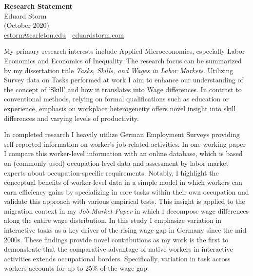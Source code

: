 \documentclass[a4paper,11pt]{article}
\begin{document}
\thispagestyle{plain}

\begin{center}
 {\Large \textbf{Research Statement}} \\
 Eduard Storm \\
 (October 2020) \\
 \href{mailto:estorm@carleton.edu}{estorm@carleton.edu} $|$ \href{https://eduardstorm.com/}{eduardstorm.com}
\end{center}

\noindent

My primary research interests include Applied Microeconomics, especially Labor Economics and Economics of Inequality. The research focus can be summarized by my dissertation title \textit{Tasks, Skills, and Wages in Labor Markets}. Utilizing Survey data on Tasks performed at work I aim to enhance our understanding of the concept of `Skill' and how it translates into Wage differences. In contrast to conventional methods, relying on formal qualifications such as education or experience, emphasis on workplace heterogeneity offers novel insight into skill differences and varying levels of productivity. 


In completed research I heavily utilize German Employment Surveys providing self-reported information on worker's job-related activities. In one working paper I compare this worker-level information with an online database, which is based on (commonly used) occupation-level data and assessment by labor market experts about occupation-specific requirements. Notably, I highlight the conceptual benefits of worker-level data in a simple model in which workers can earn efficiency gains by specializing in core tasks within their own occupation and validate this approach with various empirical tests. This insight is applied to the migration context in my \textit{Job Market Paper} in which I decompose wage differences along the entire wage distribution. In this study I emphasize variation in interactive tasks as a key driver of the rising wage gap in Germany since the mid 2000s. These findings provide novel contributions as my work is the first to demonstrate that the comparative advantage of native workers in interactive activities extends occupational borders. Specifically, variation in task across workers accounts for up to 25\% of the wage gap. 
\end{document}
